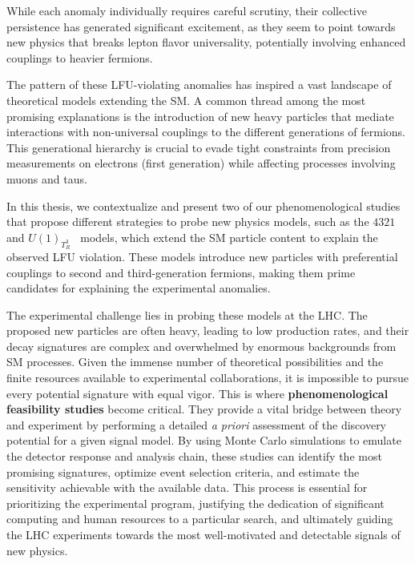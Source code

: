 While each anomaly individually requires careful scrutiny, their collective persistence has generated significant excitement, as they seem to point towards new physics that breaks lepton flavor universality, potentially involving enhanced couplings to heavier fermions.


The pattern of these LFU-violating anomalies has inspired a vast landscape of theoretical models extending the SM. A common thread among the most promising explanations is the introduction of new heavy particles that mediate interactions with non-universal couplings to the different generations of fermions. This generational hierarchy is crucial to evade tight constraints from precision measurements on electrons (first generation) while affecting processes involving muons and taus.

In this thesis, we contextualize and present two of our phenomenological studies that propose different strategies to probe new physics models, such as the $4321$~\cite{Florez2023} and $U(1)_{T^3_R}$~\cite{Qureshi:2024naw} models, which extend the SM particle content to explain the observed LFU violation. These models introduce new particles with preferential couplings to second and third-generation fermions, making them prime candidates for explaining the experimental anomalies.

The experimental challenge lies in probing these models at the LHC. The proposed new particles are often heavy, leading to low production rates, and their decay signatures are complex and overwhelmed by enormous  backgrounds from SM processes. Given the immense number of theoretical possibilities and the finite resources available to experimental collaborations, it is impossible to pursue every potential signature with equal vigor. This is where \textbf{phenomenological feasibility studies} become critical. They provide a vital bridge between theory and experiment by performing a detailed \textit{a priori} assessment of the discovery potential for a given signal model. By using Monte Carlo simulations to emulate the detector response and analysis chain, these studies can identify the most promising signatures, optimize event selection criteria, and estimate the sensitivity achievable with the available data. This process is essential for prioritizing the experimental program, justifying the dedication of significant computing and human resources to a particular search, and ultimately guiding the LHC experiments towards the most well-motivated and detectable signals of new physics.

